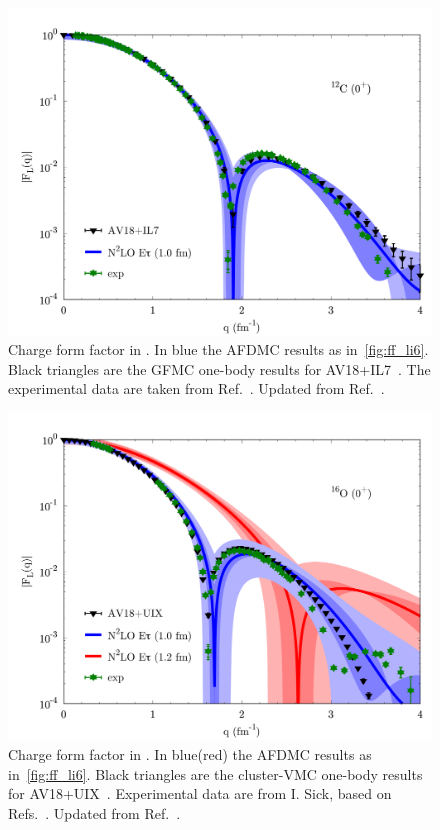 \documentclass[aps,prc,twocolumn,superscriptaddress,floatfix]{revtex4-1}
\begin{document}
\begin{figure}[htb]
\includegraphics[width=\linewidth]{ff_c12.pdf}
\caption[]{Charge form factor in . 
In blue the AFDMC results as in~\cref{fig:ff_li6}.
Black triangles are the GFMC one-body results for AV18+IL7~\cite{Lovato:2013}.
The experimental data are taken from Ref.~\cite{Devries:1987}.
Updated from Ref.~\cite{Lonardoni:2017afdmc}.}
\label{fig:ff_c12}
\end{figure}

\begin{figure}[htb]
\includegraphics[width=\linewidth]{ff_o16.pdf}
\caption[]{Charge form factor in .
In blue(red) the AFDMC results as in~\cref{fig:ff_li6}.
Black triangles are the cluster-VMC one-body results for AV18+UIX~\cite{Lonardoni:2017cvmc}.
Experimental data are from I. Sick, based on Refs.~\cite{Sick:1970,Schuetz:1975,Sick:1975}.
Updated from Ref.~\cite{Lonardoni:2017afdmc}.}
\label{fig:ff_o16}
\end{figure}
\end{document}
